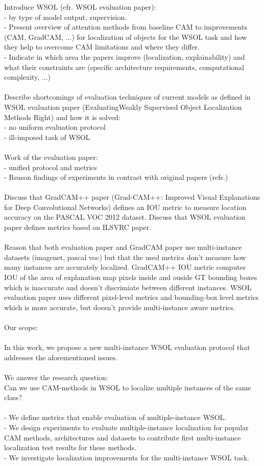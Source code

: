 Introduce WSOL (cfr. WSOL evaluation paper):\\
- by type of model output, supervision.\\
- Present overview of attention methods from baseline CAM to improvements (CAM, GradCAM, ...) for localization of objects for the WSOL task and how they help to overcome CAM limitations and where they differ.\\
- Indicate in which area the papers improve (localization, explainability) and what their constraints are (specific architecture requirements, computational complexity, ...)\\
\\
Describe shortcomings of evaluation techniques of current models as defined in WSOL evaluation paper (EvaluatingWeakly Supervised Object Localization Methods Right) and how it is solved:\\
- no uniform evaluation protocol\\
- ill-imposed task of WSOL\\
\\
Work of the evaluation paper:\\ 
- unified protocol and metrics \\
- Reason findings of experiments in contrast with original papers (refs.)\\
\\
Discuss that GradCAM++ paper (Grad-CAM++: Improved Visual Explanations for Deep Convolutional Networks) defines an IOU metric to measure location accuracy on the PASCAL VOC 2012 dataset.
Discuss that WSOL evaluation paper defines metrics based on ILSVRC paper.\\
\\
Reason that both evaluation paper and GradCAM paper use multi-instance datasets (imagenet, pascal voc) but that the used metrics don't measure how many instances are accurately localized. GradCAM++ IOU metric computes IOU of the area of explanation map pixels inside and ouside GT bounding boxes which is inaccurate and doesn't discrimiate between different instances. WSOL evaluation paper uses different pixel-level metrics and bounding-box level metrics which is more accurate, but doesn't provide multi-instance aware metrics.\\
\\
Our scope:\\
\\
In this work, we propose a new multi-instance WSOL evaluation protocol that addresses the aforementioned issues. \\\\
We answer the research question:\\
Can we use CAM-methods in WSOL to localize multiple instances of the same class?\\
\\
- We define metrics that enable evaluation of multiple-instance WSOL.\\
- We design experiments to evaluate multiple-instance localization for popular CAM methods, architectures and datasets to contribute first multi-instance localization test results for these methods.\\
- We investigate localization improvements for the multi-instance WSOL task.\\